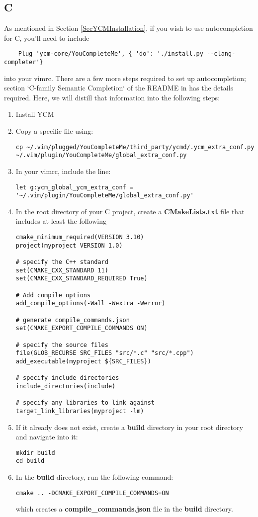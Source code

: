 \subsection{C} \label{SecYCMC}
As mentioned in Section \ref{SecYCMInstallation}, if you wish to use
autocompletion for C, you'll need to include
\begin{lstlisting}
    Plug 'ycm-core/YouCompleteMe', { 'do': './install.py --clang-completer'}
\end{lstlisting}
into your vimrc. There are a few more steps required to set up autocompletion;
section `C-family Semantic Completion` of the README in \cite{ycmcore2017ycm}
has the details required. Here, we will distill that information into the
following steps:
\begin{enumerate}
    \item Install YCM
    \item Copy a specific file using:
\begin{lstlisting}
cp ~/.vim/plugged/YouCompleteMe/third_party/ycmd/.ycm_extra_conf.py ~/.vim/plugin/YouCompleteMe/global_extra_conf.py
\end{lstlisting}
    \item In your vimrc, include the line:
\begin{lstlisting}
let g:ycm_global_ycm_extra_conf = '~/.vim/plugin/YouCompleteMe/global_extra_conf.py'
\end{lstlisting}
    \item In the root directory of your C project, create a
        \textbf{CMakeLists.txt} file that includes at least the following
\begin{lstlisting}
cmake_minimum_required(VERSION 3.10)
project(myproject VERSION 1.0)

# specify the C++ standard
set(CMAKE_CXX_STANDARD 11)
set(CMAKE_CXX_STANDARD_REQUIRED True)

# Add compile options
add_compile_options(-Wall -Wextra -Werror)

# generate compile_commands.json
set(CMAKE_EXPORT_COMPILE_COMMANDS ON)

# specify the source files
file(GLOB_RECURSE SRC_FILES "src/*.c" "src/*.cpp")
add_executable(myproject ${SRC_FILES})

# specify include directories
include_directories(include)

# specify any libraries to link against
target_link_libraries(myproject -lm)
\end{lstlisting}
    \item If it already does not exist, create a \textbf{build} directory in
        your root directory and navigate into it:
\begin{lstlisting}
mkdir build
cd build
\end{lstlisting}
    \item In the \textbf{build} directory, run the following command:
\begin{lstlisting}
cmake .. -DCMAKE_EXPORT_COMPILE_COMMANDS=ON
\end{lstlisting}
    which creates a \textbf{compile\_commands.json} file in the \textbf{build}
    directory.
\end{enumerate}
